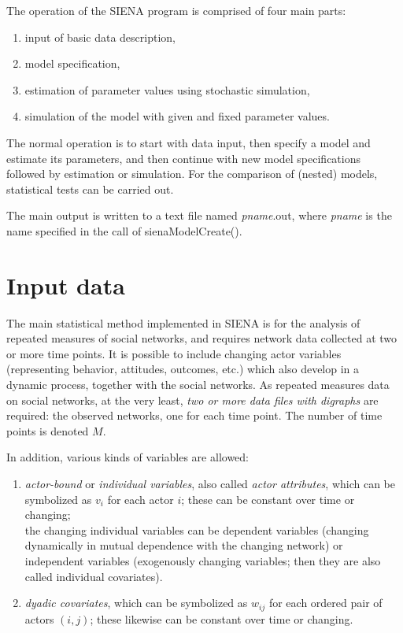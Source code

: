 \documentclass[a4paper,fleqn]{article}
\newcommand{\+}{\, + \,}
\newcommand{\SI}{{\sf SIENA }}
\begin{document}
{The operation of the \SI program is comprised of four main parts:
\begin{enumerate}
 \item input of basic data description,
 \item model specification,
 \item estimation of parameter values using stochastic simulation,
 \item simulation of the model with given and fixed parameter values.
\end{enumerate}

The normal operation is to start with data input, then specify a
model and estimate its parameters, and then continue with new
model specifications followed by estimation or simulation. For the
comparison of (nested) models, statistical tests can be carried out.


The main output is written to a text file named \textsf{{\em
pname}.out}, where \textsf{{\em pname}} is the name
specified in the call of \textsf{sienaModelCreate()}.

\begin{print}
\newpage
\end{print}

\section{Input data}
\label{S_InputData}

The main statistical method implemented in \SI  is for the analysis
of repeated measures of social networks, and requires network data
collected at two or more time points. It is possible to include
changing actor variables (representing behavior, attitudes,
outcomes, etc.) which also develop in a dynamic process, together
with the social networks.
As repeated measures data on social networks, at the very least, {\em two or more data
files with digraphs} are required: the observed networks, one for
each time point. The number of time points is denoted $M$.


In addition, various kinds of variables are allowed:

\begin{enumerate}
\item {\em actor-bound} or {\em individual variables},
      also called {\em actor attributes},
      which can be symbolized as $v_i$ for each actor $i$;
      these can be constant over time or changing; \\
      the changing individual variables can be dependent variables
      (changing dynamically in mutual dependence with the changing network)
      or independent variables (exogenously changing variables;
      then they are also called individual covariates).
\item {\em dyadic covariates}, which can be symbolized as $w_{ij}$
      for each ordered pair of actors $(i,j)$;
     these likewise can be constant over time or changing.
\end{enumerate}


}
\end{document}
